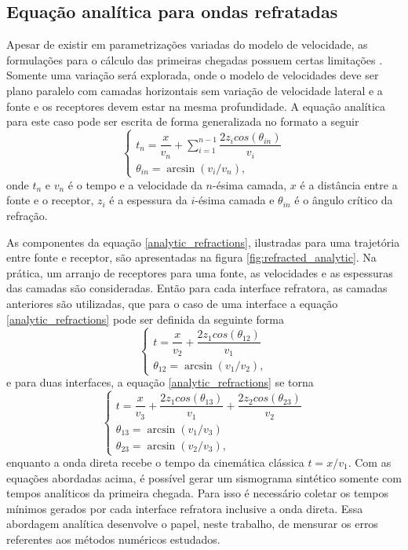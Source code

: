 \subsection*{Equação analítica para ondas refratadas}

Apesar de existir em parametrizações variadas do modelo de velocidade, as formulações para o cálculo das primeiras chegadas possuem certas limitações \cite{kearey2002introduction}. Somente uma variação será explorada, onde o modelo de velocidades deve ser plano paralelo com camadas horizontais sem variação de velocidade lateral e a fonte e os receptores devem estar na mesma profundidade. A equação analítica para este caso pode ser escrita de forma generalizada no formato a seguir  
\begin{equation}
	\begin{cases}
		t_n = \dfrac{x}{v_n} + \displaystyle\sum_{i=1}^{n-1} \dfrac{2z_i cos(\theta_{in})}{v_i}\\
		\theta_{in} = \arcsin(v_i / v_n),
	\end{cases}
	\label{analytic_refractions}
\end{equation}
\noindent onde $t_n$ e $v_n$ é o tempo e a velocidade da $n$-ésima camada, $x$ é a distância entre a fonte e o receptor, $z_i$ é a espessura da $i$-ésima camada e $\theta_{in}$ é o ângulo crítico da refração. 

As componentes da equação \ref{analytic_refractions}, ilustradas para uma trajetória entre fonte e receptor, são apresentadas na figura \ref{fig:refracted_analytic}. Na prática, um arranjo de receptores para uma fonte, as velocidades e as espessuras das camadas são consideradas. Então para cada interface refratora, as camadas anteriores são utilizadas, que para o caso de uma interface a equação \ref{analytic_refractions} pode ser definida da seguinte forma 
\begin{equation}
	\begin{cases}
		t = \dfrac{x}{v_2} + \dfrac{2z_1cos(\theta_{12})}{v_1}\\
		\theta_{12} = \arcsin(v_1 / v_2),
	\end{cases}
	\label{analytic_one_layer_case}
\end{equation}   
\noindent e para duas interfaces, a equação \ref{analytic_refractions} se torna
\begin{equation}
	\begin{cases}
		t = \dfrac{x}{v_3} + \dfrac{2z_1cos(\theta_{13})}{v_1} + \dfrac{2z_2cos(\theta_{23})}{v_2}\\
		\theta_{13} = \arcsin(v_1 / v_3) \\ 
		\theta_{23} = \arcsin(v_2 / v_3), 
	\end{cases}
	\label{analytic_two_layer_case}
\end{equation}   
\noindent enquanto a onda direta recebe o tempo da cinemática clássica $t = x / v_1$. Com as equações abordadas acima, é possível gerar um sismograma sintético somente com tempos analíticos da primeira chegada. Para isso é necessário coletar os tempos mínimos gerados por cada interface refratora inclusive a onda direta. Essa abordagem analítica desenvolve o papel, neste trabalho, de mensurar os erros referentes aos métodos numéricos estudados.

